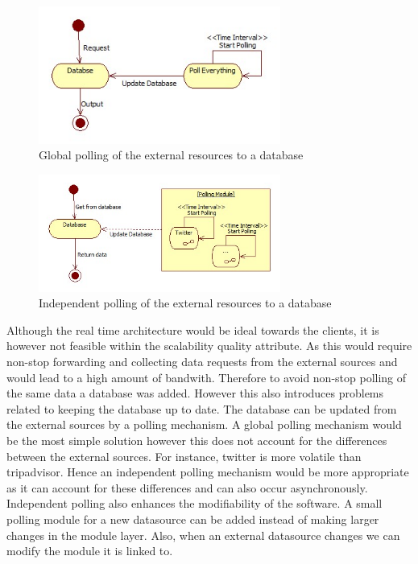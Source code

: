 \documentclass{article}
\begin{document}
\begin{figure}[!]
\centering
\includegraphics[width=300px]{GlobalPolling}
\caption{Global polling of the external resources to a database}
\label{fig:fig3}
\end{figure}

\begin{figure}[!]
\centering
\includegraphics[width=300px]{IndependentPolling}
\caption{Independent polling of the external resources to a database}
\label{fig:fig4}
\end{figure}

Although the real time architecture would be ideal towards the clients, it is however not feasible within the scalability quality attribute. As this would require non-stop forwarding and collecting data requests from the external sources and would lead to a high amount of bandwith. Therefore to avoid non-stop polling of the same data a database was added. However this also introduces problems related to keeping the database up to date. The database can be updated from the external sources by a polling mechanism. A global polling mechanism would be the most simple solution however this does not account for the differences between the external sources. For instance, twitter is more volatile than tripadvisor. Hence an independent polling mechanism would be more appropriate as it can account for these differences and can also occur asynchronously. 
Independent polling also enhances the modifiability of the software.
A small polling module for a new datasource can be added instead of making larger changes in the module layer. Also, when an external datasource changes we can modify the module it is linked to.
\end{document}
